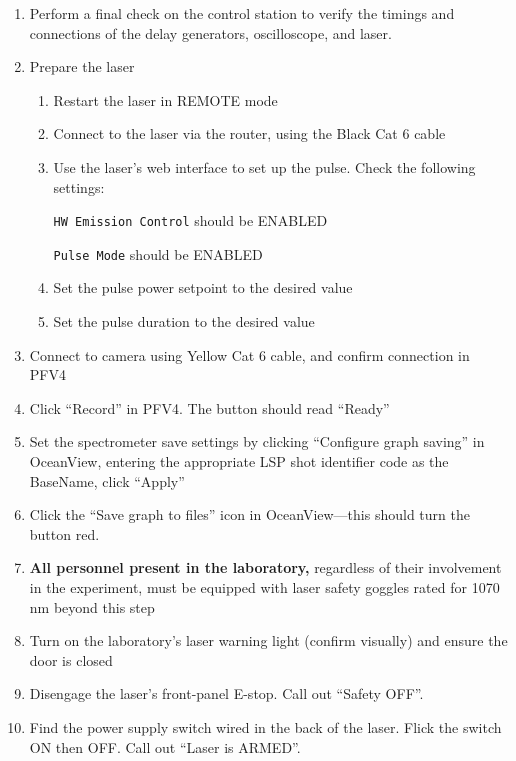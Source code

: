 \begin{enumerate}
\def\labelenumi{\arabic{enumi}.}
\item
  Perform a final check on the control station to verify the timings and
  connections of the delay generators, oscilloscope, and laser.
\item
  Prepare the laser

  \begin{enumerate}
  \def\labelenumii{\arabic{enumii}.}
  \item
    Restart the laser in REMOTE mode
  \item
    Connect to the laser via the router, using the Black Cat 6 cable
  \item
    Use the laser's web interface to set up the pulse. Check the
    following settings:

    \texttt{HW\ Emission\ Control} should be ENABLED

    \texttt{Pulse\ Mode} should be ENABLED

  \item
    Set the pulse power setpoint to the desired value
  \item
    Set the pulse duration to the desired value
  \end{enumerate}
\item
  Connect to camera using Yellow Cat 6 cable, and confirm connection in
  PFV4
\item
  Click ``Record'' in PFV4. The button should read ``Ready''
\item
  Set the spectrometer save settings by clicking ``Configure graph
  saving'' in OceanView, entering the appropriate LSP shot identifier
  code as the BaseName, click ``Apply''
\item
  Click the ``Save graph to files'' icon in OceanView---this should turn
  the button red.
\item
  \textbf{All
  personnel present in the
  laboratory,}
  regardless of their involvement in the experiment,
  must
  be equipped with laser safety goggles rated for 1070 nm beyond this
  step
\item
  Turn on the laboratory's laser warning light (confirm visually) and
  ensure the door is closed

\item
  Disengage the laser's front-panel E-stop. Call out ``Safety OFF''.
\item
  Find the power supply switch wired in the back of the laser. Flick the
  switch ON then OFF. Call out ``Laser is ARMED''.


\end{enumerate}
